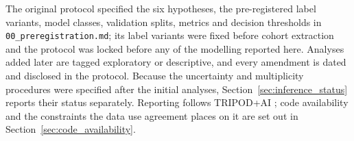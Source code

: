 The original protocol specified the six hypotheses, the pre-registered label
variants, model classes, validation splits, metrics and decision thresholds in
\texttt{00\_preregistration.md}; its label variants were fixed before cohort
extraction and the protocol was locked before any of the modelling reported
here. Analyses added later are tagged exploratory or descriptive, and every
amendment is dated and disclosed in the protocol. Because the uncertainty and
multiplicity procedures were specified after the initial analyses,
Section~\ref{sec:inference_status} reports their status separately. Reporting
follows TRIPOD+AI \cite{collins2024tripodai}; code availability and the
constraints the data use agreement places on it are set out in
Section~\ref{sec:code_availability}.
